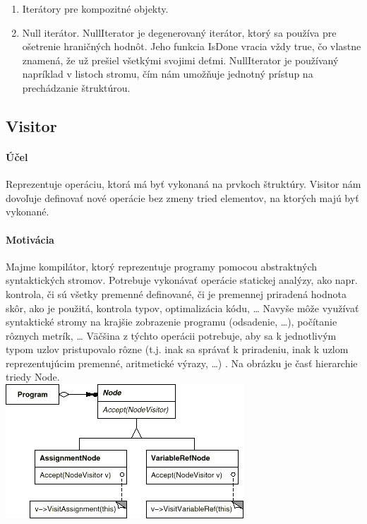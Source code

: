 \begin{enumerate}
				\item Iterátory pre kompozitné objekty.
				\item Null iterátor. NullIterator je degenerovaný iterátor, ktorý sa používa pre ošetrenie hraničných hodnôt. Jeho funkcia IsDone vracia vždy true, čo vlastne znamená, že už prešiel všetkými svojimi deťmi. NullIterator je používaný napríklad v listoch stromu, čím nám umožňuje jednotný prístup na prechádzanie štruktúrou.
			\end{enumerate}


	\subsection{Visitor}
		\paragraph{Účel}
			Reprezentuje operáciu, ktorá má byť vykonaná na prvkoch štruktúry. Visitor nám dovoľuje definovať nové operácie bez zmeny tried elementov, na ktorých majú byť vykonané.
		\paragraph{Motivácia}
		Majme kompilátor, ktorý reprezentuje programy pomocou abstraktných syntaktických stromov. Potrebuje vykonávať operácie statickej analýzy, ako napr. kontrola, či sú všetky premenné definované, či je premennej priradená hodnota skôr, ako je použitá, kontrola typov, optimalizácia kódu, … Navyše môže využívať syntaktické stromy na krajšie zobrazenie programu (odsadenie, …), počítanie rôznych metrík, … Väčšina z týchto operácii potrebuje, aby sa k jednotlivým typom uzlov pristupovalo rôzne (t.j. inak sa správať k priradeniu, inak k uzlom reprezentujúcim premenné, aritmetické výrazy, …) . Na obrázku je časť hierarchie triedy Node.\\


			\includegraphics[width=.7\textwidth]{images/programovanie/visitor1}


